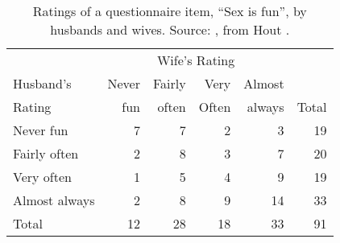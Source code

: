 \begin{table}[htb]
\caption[Ratings of a questionnaire item, ``Sex is fun'', by husbands and wives]{Ratings of a questionnaire item, ``Sex is fun'', by husbands and wives. Source: \citet[Table 2.10]{Agresti:90}, from Hout \etal.}\label{tab:sexisfun}
\begin{center}
 \begin{tabular}{l|rrrr|r}
  \hline
            & \multicolumn{4}{c|}{Wife's Rating} & \\
  Husband's & Never & Fairly & Very & Almost &  \\ 
  Rating & fun & often & Often & always & Total \\ 
  \hline
  Never fun     & 7 & 7 & 2 & 3 & 19 \\ 
  Fairly often  & 2 & 8 & 3 & 7 & 20 \\ 
  Very often    & 1 & 5 & 4 & 9 & 19 \\ 
  Almost always & 2 & 8 & 9 & 14 & 33 \\ 
  \hline
  Total & 12 & 28 & 18 & 33 & 91 \\ 
  \hline
 \end{tabular}
\end{center}
\end{table}
